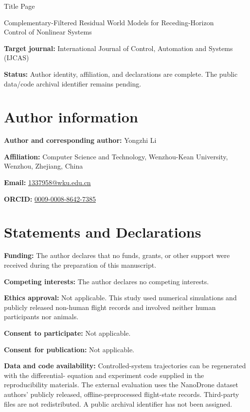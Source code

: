 \documentclass[11pt]{article}
\begin{document}
\begin{center}
{\Large Title Page}\par\medskip
{\large Complementary-Filtered Residual World Models for Receding-Horizon\\
Control of Nonlinear Systems}
\end{center}

\noindent\textbf{Target journal:} International Journal of Control,
Automation and Systems (IJCAS)

\noindent\textbf{Status:} Author identity, affiliation, and declarations are
complete. The public data/code archival identifier remains pending.

\section*{Author information}
\noindent\textbf{Author and corresponding author:} Yongzhi Li

\noindent\textbf{Affiliation:} Computer Science and Technology,
Wenzhou-Kean University, Wenzhou, Zhejiang, China

\noindent\textbf{Email:} \href{mailto:1337958@wku.edu.cn}{1337958@wku.edu.cn}

\noindent\textbf{ORCID:}
\href{https://orcid.org/0009-0008-8642-7385}{0009-0008-8642-7385}

\section*{Statements and Declarations}
\noindent\textbf{Funding:} The author declares that no funds, grants, or other
support were received during the preparation of this manuscript.

\medskip\noindent\textbf{Competing interests:} The author declares no
competing interests.

\medskip\noindent\textbf{Ethics approval:} Not applicable. This study used
numerical simulations and publicly released non-human flight records and
involved neither human participants nor animals.

\medskip\noindent\textbf{Consent to participate:} Not applicable.

\medskip\noindent\textbf{Consent for publication:} Not applicable.

\medskip\noindent\textbf{Data and code availability:} Controlled-system
trajectories can be regenerated with the differential-
equation and experiment code supplied in the reproducibility materials. The
external evaluation uses the NanoDrone dataset authors' publicly released,
offline-preprocessed flight-state records. Third-party files are not
redistributed. A public archival identifier has not been assigned.
\end{document}
